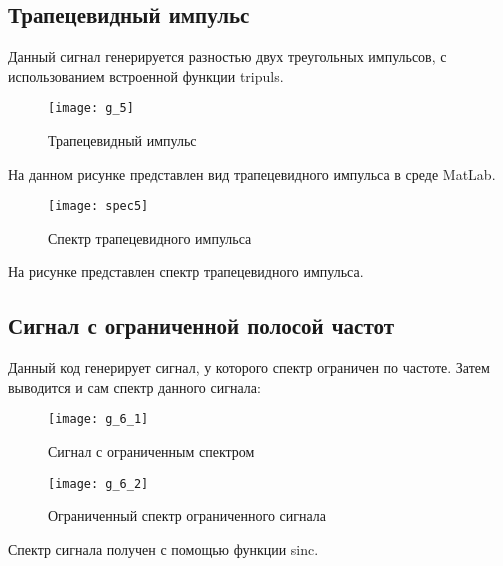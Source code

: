 \subsection{Трапецевидный импульс}


\parindent=1cm
Данный сигнал генерируется разностью двух треугольных импульсов, с использованием встроенной функции tripuls.

\begin{figure}[H]
	\begin{center}
		\texttt{[image: g\_5]}
		\caption{Трапецевидный импульс} 
		\label{pic:g_5} %
	\end{center}
\end{figure}
На данном рисунке представлен вид трапецевидного импульса в среде MatLab.

\begin{figure}[H]
	\begin{center}
		\texttt{[image: spec5]}
		\caption{Спектр трапецевидного импульса} 
		\label{pic:spec5} %
	\end{center}
\end{figure}
На рисунке представлен спектр трапецевидного импульса.

\subsection{Сигнал с ограниченной полосой частот}


\parindent=1cm
Данный код генерирует сигнал, у которого спектр ограничен по частоте. Затем выводится и сам спектр данного сигнала:

\begin{figure}[H]
	\begin{center}
		\texttt{[image: g\_6\_1]}
		\caption{Сигнал с ограниченным спектром} 
		\label{pic:g_6_1} %
	\end{center}
\end{figure}
\begin{figure}[H]
	\begin{center}
		\texttt{[image: g\_6\_2]}
		\caption{Ограниченный спектр ограниченного сигнала} 
		\label{pic:g_6_2} %
	\end{center}
\end{figure}
Спектр сигнала получен с помощью функции sinc.

